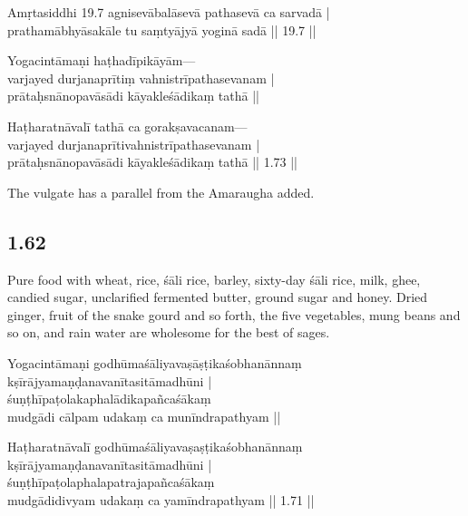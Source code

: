 \begin{ekdosis}
\begin{sources}[hp01_061]
Amṛtasiddhi 19.7
\startverse
agnisevābalāsevā pathasevā ca sarvadā |\\
prathamābhyāsakāle tu saṃtyājyā yoginā sadā || 19.7 ||
\endverse
\end{sources}

\begin{testimonia}[hp01_061]
Yogacintāmaṇi
\startverse
haṭhadīpikāyām—\\
varjayed durjanaprītiṃ vahnistrīpathasevanam |\\
prātaḥsnānopavāsādi kāyakleśādikaṃ tathā ||
\endverse

Haṭharatnāvalī
\startverse
tathā ca gorakṣavacanam---\\
varjayed durjanaprītivahnistrīpathasevanam |\\
prātaḥsnānopavāsādi kāyakleśādikaṃ tathā || 1.73 ||
\endverse
\end{testimonia}

\begin{philcomm}[hp01_061]
The vulgate has a parallel from the Amaraugha added. 
\end{philcomm}

\subsection*{1.62}
\begin{translation}[hp01_062]
Pure food with wheat, rice, śāli rice, barley, sixty-day śāli rice, milk, ghee, candied sugar, unclarified fermented butter, ground sugar and honey. Dried ginger, fruit of the snake gourd and so forth, the five vegetables, mung beans and so on, and rain water are wholesome for the best of sages.
\end{translation}

\begin{sources}[hp01_062]
\end{sources}

\begin{testimonia}[hp01_062]
Yogacintāmaṇi
\startverse
godhūmaśāliyavaṣāṣṭikaśobhanānnaṃ\\
kṣīrājyamaṇḍanavanītasitāmadhūni |\\
śuṇṭhīpaṭolakaphalādikapañcaśākaṃ\\
mudgādi cālpam udakaṃ ca munīndrapathyam ||
\endverse

Haṭharatnāvalī
\startverse
godhūmaśāliyavaṣaṣṭikaśobhanānnaṃ \\
kṣīrājyamaṇḍanavanītasitāmadhūni |\\
śuṇṭhīpaṭolaphalapatrajapañcaśākaṃ \\
mudgādidivyam udakaṃ ca yamīndrapathyam || 1.71 ||
\endverse


\end{testimonia}
\end{ekdosis}

